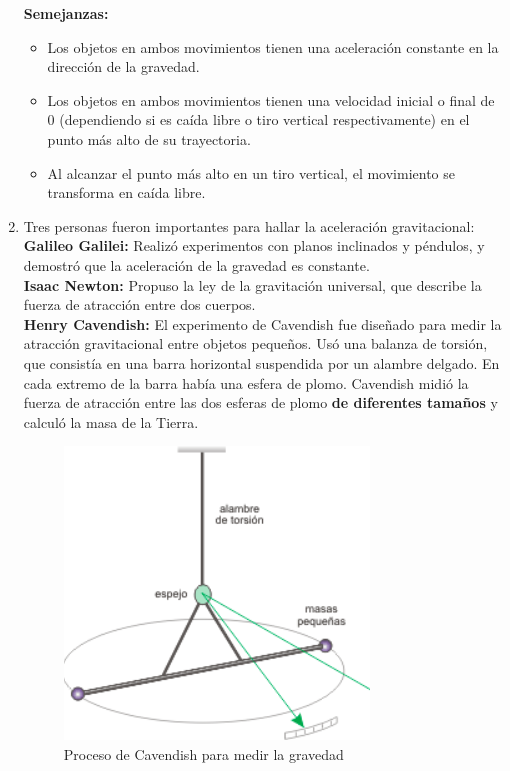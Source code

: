 \begin{multicols}{2}
\begin{enumerate}
    \textbf{Semejanzas:}
    \begin{itemize}
        \item Los objetos en ambos movimientos tienen una aceleración constante en la dirección de la gravedad.
        \item Los objetos en ambos movimientos tienen una velocidad inicial o final de 0 (dependiendo si es caída libre o tiro vertical respectivamente) en el punto más alto de su trayectoria.
        \item Al alcanzar el punto más alto en un tiro vertical, el movimiento se transforma en caída libre.
    \end{itemize}
\item Tres personas fueron importantes para hallar la aceleración gravitacional:\\
    \textbf{Galileo Galilei:} Realizó experimentos con planos inclinados y péndulos, y demostró que la aceleración de la gravedad es constante.\\
    \textbf{Isaac Newton:} Propuso la ley de la gravitación universal, que describe la fuerza de atracción entre dos cuerpos.\\
    \textbf{Henry Cavendish:} El experimento de Cavendish fue diseñado para medir la atracción gravitacional entre objetos pequeños. 
    Usó una balanza de torsión, que consistía en una barra horizontal suspendida por un alambre delgado. En cada extremo de la barra había una esfera de plomo. 
    Cavendish midió la fuerza de atracción entre las dos esferas de plomo \textbf{de diferentes tamaños} y calculó la masa de la Tierra.

    \begin{figure}[H]
        \centering
        \includegraphics[scale=0.7]{fig/procesoCavendish-gravedad.png}
        \caption{Proceso de Cavendish para medir la gravedad}
    \end{figure}
\end{enumerate}
    

\end{multicols}
